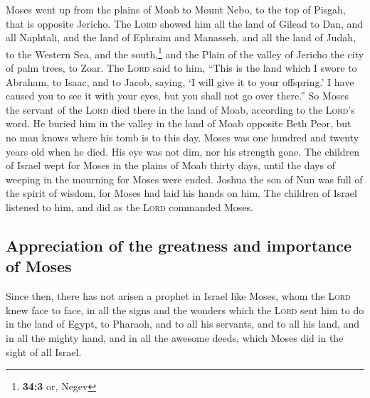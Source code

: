  Moses went up from the plains of Moab to Mount Nebo, to
the top of Pisgah, that is opposite Jericho. The \textsc{Lord} showed
him all the land of Gilead to Dan,  and all Naphtali, and
the land of Ephraim and Manasseh, and all the land of Judah, to the
Western Sea,  and the south,\footnote{\textbf{34:3} or,
  Negev} and the Plain of the valley of Jericho the city of palm trees,
to Zoar.  The \textsc{Lord} said to him, ``This is the
land which I swore to Abraham, to Isaac, and to Jacob, saying, `I will
give it to your offspring.' I have caused you to see it with your eyes,
but you shall not go over there.''  So Moses the servant
of the \textsc{Lord} died there in the land of Moab, according to the
\textsc{Lord}'s word.  He buried him in the valley in the
land of Moab opposite Beth Peor, but no man knows where his tomb is to
this day.  Moses was one hundred and twenty years old when
he died. His eye was not dim, nor his strength gone.  The
children of Israel wept for Moses in the plains of Moab thirty days,
until the days of weeping in the mourning for Moses were ended.
 Joshua the son of Nun was full of the spirit of wisdom,
for Moses had laid his hands on him. The children of Israel listened to
him, and did as the \textsc{Lord} commanded Moses.

\hypertarget{appreciation-of-the-greatness-and-importance-of-moses}{%
\subsection{Appreciation of the greatness and importance of
Moses}\label{appreciation-of-the-greatness-and-importance-of-moses}}

 Since then, there has not arisen a prophet in Israel
like Moses, whom the \textsc{Lord} knew face to face,  in
all the signs and the wonders which the \textsc{Lord} sent him to do in
the land of Egypt, to Pharaoh, and to all his servants, and to all his
land,  and in all the mighty hand, and in all the awesome
deeds, which Moses did in the sight of all Israel.
